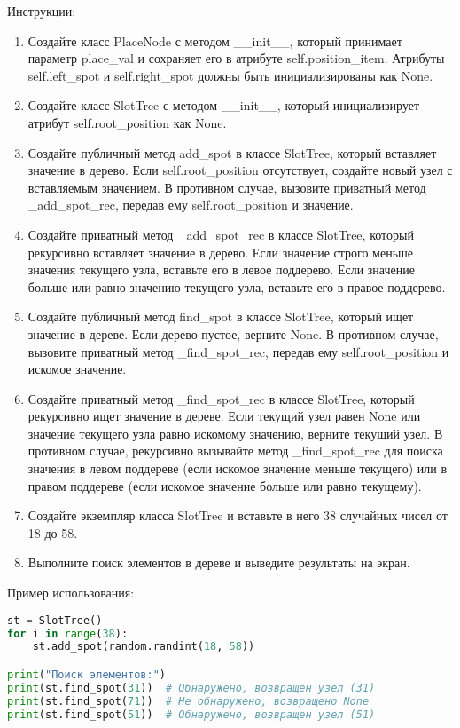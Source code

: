 \begin{enumerate}
Инструкции:
\begin{enumerate}
    \item Создайте класс PlaceNode с методом \_\_init\_\_, который принимает параметр place\_val и сохраняет его в атрибуте self.position\_item. Атрибуты self.left\_spot и self.right\_spot должны быть инициализированы как None.
    \item Создайте класс SlotTree с методом \_\_init\_\_, который инициализирует атрибут self.root\_position как None.
    \item Создайте публичный метод add\_spot в классе SlotTree, который вставляет значение в дерево. Если self.root\_position отсутствует, создайте новый узел с вставляемым значением. В противном случае, вызовите приватный метод \_add\_spot\_rec, передав ему self.root\_position и значение.
    \item Создайте приватный метод \_add\_spot\_rec в классе SlotTree, который рекурсивно вставляет значение в дерево. Если значение строго меньше значения текущего узла, вставьте его в левое поддерево. Если значение больше или равно значению текущего узла, вставьте его в правое поддерево.
    \item Создайте публичный метод find\_spot в классе SlotTree, который ищет значение в дереве. Если дерево пустое, верните None. В противном случае, вызовите приватный метод \_find\_spot\_rec, передав ему self.root\_position и искомое значение.
    \item Создайте приватный метод \_find\_spot\_rec в классе SlotTree, который рекурсивно ищет значение в дереве. Если текущий узел равен None или значение текущего узла равно искомому значению, верните текущий узел. В противном случае, рекурсивно вызывайте метод \_find\_spot\_rec для поиска значения в левом поддереве (если искомое значение меньше текущего) или в правом поддереве (если искомое значение больше или равно текущему).
    \item Создайте экземпляр класса SlotTree и вставьте в него 38 случайных чисел от 18 до 58.
    \item Выполните поиск элементов в дереве и выведите результаты на экран.
\end{enumerate}

Пример использования:
\begin{lstlisting}[language=Python]
st = SlotTree()
for i in range(38):
    st.add_spot(random.randint(18, 58))

print("Поиск элементов:")
print(st.find_spot(31))  # Обнаружено, возвращен узел (31)
print(st.find_spot(71))  # Не обнаружено, возвращено None
print(st.find_spot(51))  # Обнаружено, возвращен узел (51)
\end{lstlisting}


\end{enumerate}
